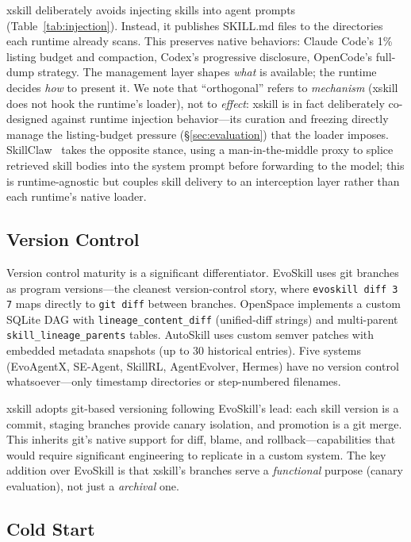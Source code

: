 \documentclass{article}
\begin{document}
xskill deliberately avoids injecting skills into agent prompts (Table~\ref{tab:injection}). Instead, it publishes SKILL.md files to the directories each runtime already scans. This preserves native behaviors: Claude Code's 1\% listing budget and compaction, Codex's progressive disclosure, OpenCode's full-dump strategy. The management layer shapes \emph{what} is available; the runtime decides \emph{how} to present it. We note that ``orthogonal'' refers to \emph{mechanism} (xskill does not hook the runtime's loader), not to \emph{effect}: xskill is in fact deliberately co-designed against runtime injection behavior---its curation and freezing directly manage the listing-budget pressure (\S\ref{sec:evaluation}) that the loader imposes. SkillClaw~\citep{amapml2026skillclaw} takes the opposite stance, using a man-in-the-middle proxy to splice retrieved skill bodies into the system prompt before forwarding to the model; this is runtime-agnostic but couples skill delivery to an interception layer rather than each runtime's native loader.

\subsection{Version Control}
\label{sec:versioncontrol}

Version control maturity is a significant differentiator. EvoSkill uses git branches as program versions---the cleanest version-control story, where \texttt{evoskill diff 3 7} maps directly to \texttt{git diff} between branches. OpenSpace implements a custom SQLite DAG with \texttt{lineage\_content\_diff} (unified-diff strings) and multi-parent \texttt{skill\_lineage\_parents} tables. AutoSkill uses custom semver patches with embedded metadata snapshots (up to 30 historical entries). Five systems (EvoAgentX, SE-Agent, SkillRL, AgentEvolver, Hermes) have no version control whatsoever---only timestamp directories or step-numbered filenames.

xskill adopts git-based versioning following EvoSkill's lead: each skill version is a commit, staging branches provide canary isolation, and promotion is a git merge. This inherits git's native support for diff, blame, and rollback---capabilities that would require significant engineering to replicate in a custom system. The key addition over EvoSkill is that xskill's branches serve a \emph{functional} purpose (canary evaluation), not just a \emph{archival} one.

\subsection{Cold Start}
\label{sec:coldstart}
\end{document}
